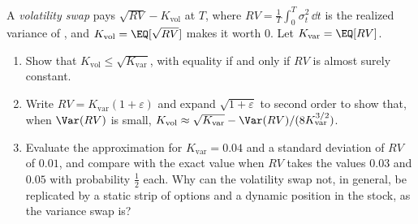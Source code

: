 
\begin{exercise}\label{ex:iv-vol-swap}
\easy A \emph{volatility swap} pays $\sqrt{RV}-K_{\mathrm{vol}}$ at $T$, where $RV=\frac1T\int_0^T\sigma_t^2\,\dd t$ is
the realized variance of , and $K_{\mathrm{vol}}=\EQ[\sqrt{RV}]$ makes it
worth $0$. Let $K_{\mathrm{var}}=\EQ[RV]$.
\begin{enumerate}[label=(\alph*)]
  \item Show that $K_{\mathrm{vol}}\le\sqrt{K_{\mathrm{var}}}$, with equality if and only if $RV$ is almost
    surely constant.
  \item Write $RV=K_{\mathrm{var}}(1+\varepsilon)$ and expand $\sqrt{1+\varepsilon}$ to second order to show
    that, when $\Var(RV)$ is small, $K_{\mathrm{vol}}\approx\sqrt{K_{\mathrm{var}}}-\Var(RV)/(8K_{\mathrm{var}}^{3/2})$.
  \item Evaluate the approximation for $K_{\mathrm{var}}=0.04$ and a standard deviation of $RV$ of $0.01$,
    and compare with the exact value when $RV$ takes the values $0.03$ and $0.05$ with probability
    $\frac12$ each. Why can the volatility swap not, in general, be replicated by a static strip of
    options and a dynamic position in the stock, as the variance swap is?
\end{enumerate}
\end{exercise}

